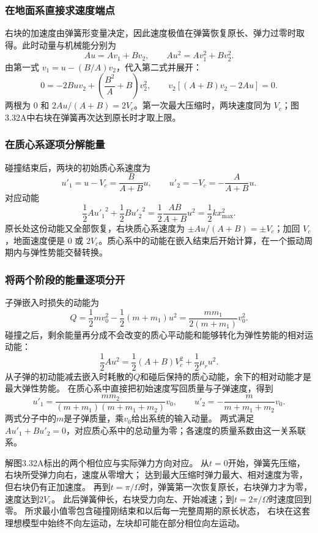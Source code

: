 \documentclass[UTF8,fontset=fandol,a4paper,11pt]{ctexart}
\begin{document}
\subsubsection*{在地面系直接求速度端点}
右块的加速度由弹簧形变量决定，因此速度极值在弹簧恢复原长、弹力过零时取得。此时动量与机械能分别为
\[
Au=Av_1+Bv_2,\qquad Au^2=Av_1^2+Bv_2^2.
\]
由第一式 $v_1=u-(B/A)v_2$，代入第二式并展开：
\[
0=-2Buv_2+\left(\frac{B^2}{A}+B\right)v_2^2,
\qquad v_2[(A+B)v_2-2Au]=0.
\]
两根为 $0$ 和 $2Au/(A+B)=2V_c$。第一次最大压缩时，两块速度同为 $V_c$；图3.32A中右块在弹簧再次达到原长时才取上限。

\subsubsection*{在质心系逐项分解能量}
碰撞结束后，两块的初始质心系速度为
\[
u'_1=u-V_c=\frac{B}{A+B}u,\qquad
u'_2=-V_c=-\frac{A}{A+B}u.
\]
对应动能
\[
\frac12A{u'_1}^2+\frac12B{u'_2}^2
=\frac12\frac{AB}{A+B}u^2
=\frac12kx_{\max}^2.
\]
原长处这份动能又全部恢复，右块质心系速度为 $\pm Au/(A+B)=\pm V_c$；加回 $V_c$，地面速度便是 $0$ 或 $2V_c$。质心系中的动能在嵌入结束后开始计算，在一个振动周期内与弹性势能交替转换。
\subsubsection*{将两个阶段的能量逐项分开}
子弹嵌入时损失的动能为
\[
Q=\frac12mv_0^2-\frac12(m+m_1)u^2
=\frac{mm_1}{2(m+m_1)}v_0^2.
\]
碰撞之后，剩余能量再分成不会改变的质心平动能和能够转化为弹性势能的相对运动能：
\[
\frac12Au^2=\frac12(A+B)V_c^2+\frac12\mu_r u^2.
\]
从子弹的初动能减去嵌入时耗散的$Q$和碰后保持的质心动能，余下的相对动能才是最大弹性势能。
在质心系中直接把初始速度写回质量与子弹速度，得到
\[
u'_1=\frac{mm_2}{(m+m_1)(m+m_1+m_2)}v_0,
\qquad u'_2=-\frac{m}{m+m_1+m_2}v_0.
\]
两式分子中的$m$是子弹质量，乘$v_0$给出系统的输入动量。
两式满足$Au'_1+Bu'_2=0$，对应质心系中的总动量为零；各速度的质量系数由这一关系联系。

解图3.32A标出的两个相位应与实际弹力方向对应。
从$t=0$开始，弹簧先压缩，右块所受弹力向右，速度从零增大；
达到最大压缩时弹力最大、相对速度为零，但右块仍有正加速度。
再到$t=\pi/\Omega$时，弹簧第一次恢复原长，右块弹力才为零，速度达到$2V_c$。
此后弹簧伸长，右块受力向左、开始减速；到$t=2\pi/\Omega$时速度回到零。
所求最小值零包含碰撞刚结束和以后每一完整周期的原长状态，
右块在这套理想模型中始终不向左运动，左块却可能在部分相位向左运动。



\end{document}
